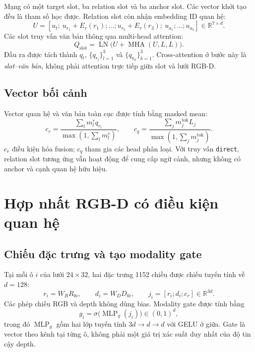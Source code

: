 Mạng có một target slot, ba relation slot và ba anchor slot.
Các vector khởi tạo đều là tham số học được. Relation slot còn nhận
embedding ID quan hệ:
\begin{equation}
    U=[u_t;\ u_{r_1}+E_r(r_1);\ldots;u_{r_3}+E_r(r_3);
    \ u_{a_1};\ldots;u_{a_3}]\in\mathbb{R}^{7\times d}.
\end{equation}
Các slot truy vấn văn bản thông qua multi-head attention:
\begin{equation}
    Q_{\mathrm{slot}}=
    \operatorname{LN}\bigl(U+\operatorname{MHA}(U,L,L)\bigr).
    \label{eq:method-query-slots}
\end{equation}
Đầu ra được tách thành $q_t$, $\{q_{r_l}\}_{l=1}^{3}$ và
$\{q_{a_k}\}_{k=1}^{3}$. Cross-attention ở bước này là
\emph{slot--văn bản}, không phải attention trực tiếp giữa slot và
lưới RGB-D.

\subsection{Vector bối cảnh}

Vector quan hệ và văn bản toàn cục được tính bằng masked mean:
\begin{equation}
    c_r=\frac{\sum_l m_l^r q_{r_l}}{\max(1,\sum_l m_l^r)},\qquad
    c_q=\frac{\sum_j m_j^{\mathrm{tok}} L_j}
    {\max(1,\sum_j m_j^{\mathrm{tok}})}.
\end{equation}
$c_r$ điều kiện hóa fusion; $c_q$ tham gia các head phân loại.
Với truy vấn \texttt{direct}, relation slot tương ứng vẫn hoạt động
để cung cấp ngữ cảnh, nhưng không có anchor và cạnh quan hệ hữu hiệu.

\section{Hợp nhất RGB-D có điều kiện quan hệ}
\label{sec:method-fusion}

\subsection{Chiếu đặc trưng và tạo modality gate}

Tại mỗi ô $i$ của lưới $24\times32$, hai đặc trưng 1152 chiều được
chiếu tuyến tính về $d=128$:
\begin{equation}
    r_i=W_R R_{0i},\qquad d_i=W_D D_{0i},\qquad
    j_i=[r_i;d_i;c_r]\in\mathbb{R}^{3d}.
\end{equation}
Các phép chiếu RGB và depth không dùng bias. Modality gate được tính bằng
\begin{equation}
    g_i=\sigma\bigl(\operatorname{MLP}_g(j_i)\bigr)
    \in(0,1)^d,
    \label{eq:method-modality-gate}
\end{equation}
trong đó $\operatorname{MLP}_g$ gồm hai lớp tuyến tính
$3d\rightarrow d\rightarrow d$ với GELU ở giữa.
Gate là vector theo kênh tại từng ô, không phải một giá trị
xác suất duy nhất của độ tin cậy depth.

